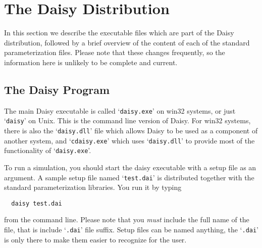 \section{The Daisy Distribution}
\label{sec:distribution}

In this section we describe the executable files which are part of the
Daisy distribution, followed by a brief overview of the content of
each of the standard parameterization files.  Please note that these
changes frequently, so the information here is unlikely to be
complete and current.

\subsection{The Daisy Program}

The main Daisy executable is called `\texttt{daisy.exe}' on win32
systems, or just `\texttt{daisy}' on Unix.  This is the command line
version of Daisy.  For win32 systems, there is also the
`\texttt{daisy.dll}' file which allows Daisy to be used as a component of
another system, and `\texttt{cdaisy.exe}' which uses
`\texttt{daisy.dll}' to provide most of the functionality of
`\texttt{daisy.exe}'.

To run a simulation, you should start the daisy executable with a
setup file as an argument.  A sample setup file named
`\texttt{test.dai}' is distributed together with the standard
parameterization libraries.  You run it by typing
\begin{verbatim}
  daisy test.dai
\end{verbatim}
from the command line.  Please note that you \emph{must} include the
full name of the file, that is include `\texttt{.dai}' file suffix.
Setup files can be named anything, the `\texttt{.dai}' is only there
to make them easier to recognize for the user.


